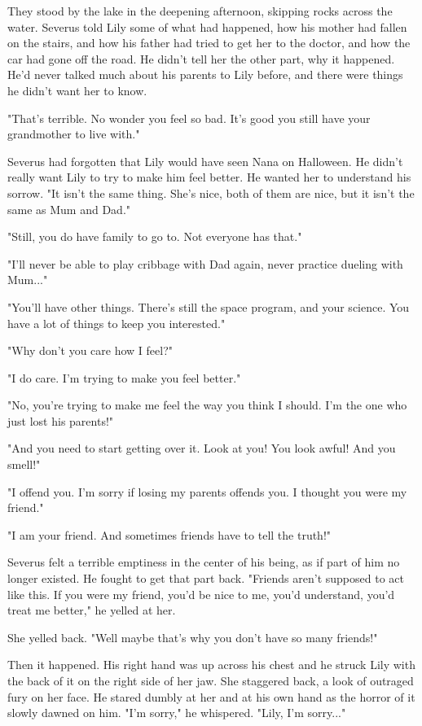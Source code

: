 \documentclass[a4paper,11pt]{article}
\begin{document}
They stood by the lake in the deepening afternoon, skipping rocks across the water. Severus told Lily some of what had happened, how his mother had fallen on the stairs, and how his father had tried to get her to the doctor, and how the car had gone off the road. He didn't tell her the other part, why it happened. He'd never talked much about his parents to Lily before, and there were things he didn't want her to know.

"That's terrible. No wonder you feel so bad. It's good you still have your grandmother to live with."

Severus had forgotten that Lily would have seen Nana on Halloween. He didn't really want Lily to try to make him feel better. He wanted her to understand his sorrow. "It isn't the same thing. She's nice, both of them are nice, but it isn't the same as Mum and Dad."

"Still, you do have family to go to. Not everyone has that."

"I'll never be able to play cribbage with Dad again, never practice dueling with Mum..."

"You'll have other things. There's still the space program, and your science. You have a lot of things to keep you interested."

"Why don't you care how I feel?"

"I do care. I'm trying to make you feel better."

"No, you're trying to make me feel the way you think I should. I'm the one who just lost his parents!"

"And you need to start getting over it. Look at you! You look awful! And you smell!"

"I offend you. I'm sorry if losing my parents offends you. I thought you were my friend."

"I am your friend. And sometimes friends have to tell the truth!"

Severus felt a terrible emptiness in the center of his being, as if part of him no longer existed. He fought to get that part back. "Friends aren't supposed to act like this. If you were my friend, you'd be nice to me, you'd understand, you'd treat me better," he yelled at her.

She yelled back. "Well maybe that's why you don't have so many friends!"

Then it happened. His right hand was up across his chest and he struck Lily with the back of it on the right side of her jaw. She staggered back, a look of outraged fury on her face. He stared dumbly at her and at his own hand as the horror of it slowly dawned on him. "I'm sorry," he whispered. "Lily, I'm sorry..."
\end{document}
